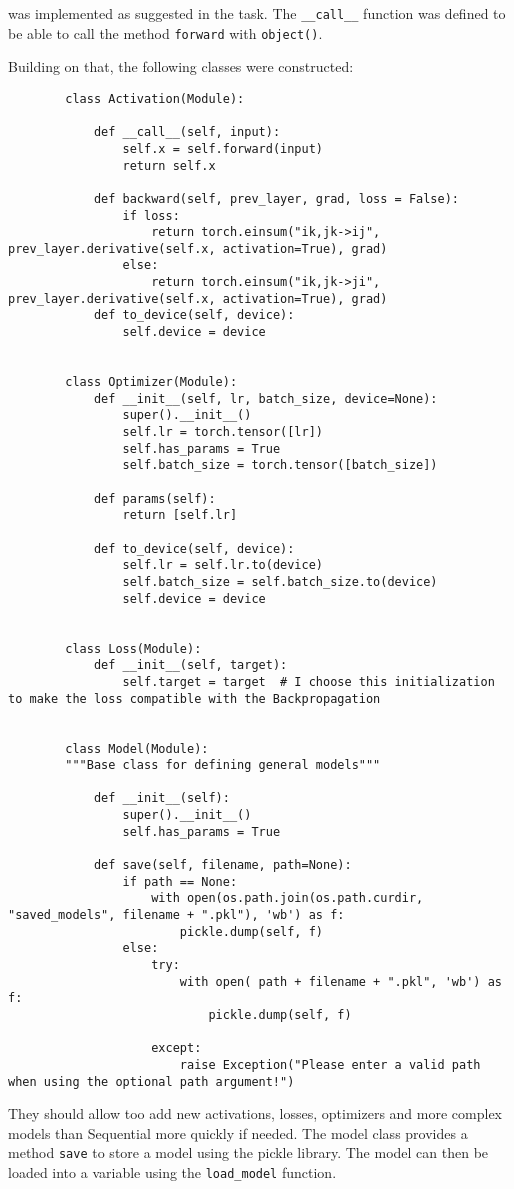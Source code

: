 \documentclass[11pt,english]{article}
\begin{document}
	was implemented as suggested in the task. The \lstinline|__call__| function was defined to be able to call the method \lstinline|forward| with \lstinline|object()|.
	
	Building on that, the following classes were constructed: 
	
	\begin{lstlisting}
		class Activation(Module):
		
			def __call__(self, input):
				self.x = self.forward(input)
				return self.x
			
			def backward(self, prev_layer, grad, loss = False):
				if loss:
					return torch.einsum("ik,jk->ij", prev_layer.derivative(self.x, activation=True), grad) 
				else:
					return torch.einsum("ik,jk->ji", prev_layer.derivative(self.x, activation=True), grad) 
			def to_device(self, device):
				self.device = device
		
		
		class Optimizer(Module):
			def __init__(self, lr, batch_size, device=None):
				super().__init__()
				self.lr = torch.tensor([lr])
				self.has_params = True
				self.batch_size = torch.tensor([batch_size])
				
			def params(self):
				return [self.lr]
			
			def to_device(self, device):
				self.lr = self.lr.to(device)
				self.batch_size = self.batch_size.to(device)
				self.device = device
		
	
		class Loss(Module):
			def __init__(self, target):
				self.target = target  # I choose this initialization to make the loss compatible with the Backpropagation 
		
	
		class Model(Module):
		"""Base class for defining general models"""
						
			def __init__(self):
				super().__init__()
				self.has_params = True
				
			def save(self, filename, path=None):
				if path == None:
					with open(os.path.join(os.path.curdir, "saved_models", filename + ".pkl"), 'wb') as f:
						pickle.dump(self, f)
				else:
					try:
						with open( path + filename + ".pkl", 'wb') as f:
							pickle.dump(self, f)
					
					except:
						raise Exception("Please enter a valid path when using the optional path argument!")
	\end{lstlisting}
	
	They should allow too add new activations, losses, optimizers and more complex models than Sequential more quickly if needed. The model class provides a method \lstinline|save| to store a model using the pickle library. The model can then be loaded into a variable using the \lstinline|load_model| function.
	
\end{document}
